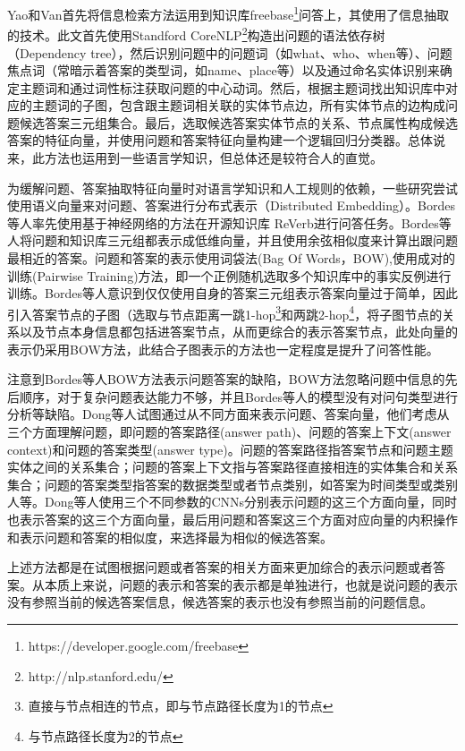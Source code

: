 Yao和Van\cite{Yao}首先将信息检索方法运用到知识库freebase\footnote{https://developer.google.com/freebase}问答上，其使用了信息抽取的技术。此文首先使用Standford CoreNLP\footnote{http://nlp.stanford.edu/}构造出问题的语法依存树（Dependency tree），然后识别问题中的问题词（如what、who、when等）、问题焦点词（常暗示着答案的类型词，如name、place等）以及通过命名实体识别来确定主题词和通过词性标注获取问题的中心动词。然后，根据主题词找出知识库中对应的主题词的子图，包含跟主题词相关联的实体节点边，所有实体节点的边构成问题候选答案三元组集合。最后，选取候选答案实体节点的关系、节点属性构成候选答案的特征向量，并使用问题和答案特征向量构建一个逻辑回归分类器。总体说来，此方法也运用到一些语言学知识，但总体还是较符合人的直觉。

为缓解问题、答案抽取特征向量时对语言学知识和人工规则的依赖，一些研究尝试使用语义向量来对问题、答案进行分布式表示（Distributed Embedding）。Bordes\cite{Bordes3}等人率先使用基于神经网络的方法在开源知识库 ReVerb\cite{Fader}进行问答任务。Bordes等人将问题和知识库三元组都表示成低维向量，并且使用余弦相似度来计算出跟问题最相近的答案。问题和答案的表示使用词袋法(Bag Of Words，BOW),使用成对的训练(Pairwise Training)方法，即一个正例随机选取多个知识库中的事实反例进行训练。Bordes\cite{Bordes1}等人意识到仅仅使用自身的答案三元组表示答案向量过于简单，因此引入答案节点的子图（选取与节点距离一跳1-hop\footnote{直接与节点相连的节点，即与节点路径长度为1的节点}和两跳2-hop\footnote{与节点路径长度为2的节点}，将子图节点的关系以及节点本身信息都包括进答案节点，从而更综合的表示答案节点，此处向量的表示仍采用BOW方法，此结合子图表示的方法也一定程度是提升了问答性能。

注意到Bordes等人BOW方法表示问题答案的缺陷，BOW方法忽略问题中信息的先后顺序，对于复杂问题表达能力不够，并且Bordes等人的模型没有对问句类型进行分析等缺陷。Dong\cite{Dong}等人试图通过从不同方面来表示问题、答案向量，他们考虑从三个方面理解问题，即问题的答案路径(answer path)、问题的答案上下文(answer context)和问题的答案类型(answer type)。问题的答案路径指答案节点和问题主题实体之间的关系集合；问题的答案上下文指与答案路径直接相连的实体集合和关系集合；问题的答案类型指答案的数据类型或者节点类别，如答案为时间类型或类别人等。Dong等人使用三个不同参数的CNNs分别表示问题的这三个方面向量，同时也表示答案的这三个方面向量，最后用问题和答案这三个方面对应向量的内积操作和表示问题和答案的相似度，来选择最为相似的候选答案。

上述方法都是在试图根据问题或者答案的相关方面来更加综合的表示问题或者答案。从本质上来说，问题的表示和答案的表示都是单独进行，也就是说问题的表示没有参照当前的候选答案信息，候选答案的表示也没有参照当前的问题信息。

